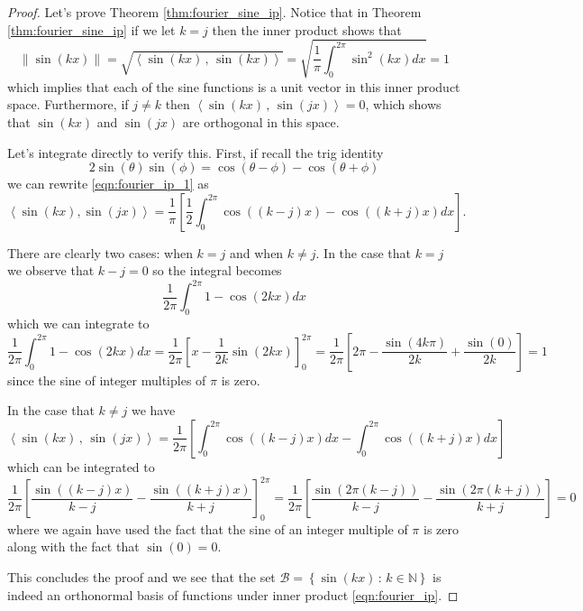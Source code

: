 \begin{proof}
    Let's prove Theorem \ref{thm:fourier_sine_ip}.  Notice that in Theorem
    \ref{thm:fourier_sine_ip} if we let $k=j$ then the inner product shows that 
    \[ \| \sin(kx) \| = \sqrt{ \left< \sin(kx) \, , \, \sin(kx) \right>} =
    \sqrt{\frac{1}{\pi} \int_0^{2\pi} \sin^2(kx) dx } = 1 \]
    which implies that each of the sine functions is a unit vector in this inner product
    space.  Furthermore, if $j \ne k$ then $\left< \sin(kx) \,,\, \sin(jx)\right> = 0$,
    which shows that $\sin(kx)$ and $\sin(jx)$ are orthogonal in this space.
    
    Let's integrate directly to verify this.  First, if recall the trig identity
    \[ 2\sin(\theta)\sin(\phi) = \cos(\theta - \phi) - \cos(\theta + \phi) \]
    we can rewrite \eqref{eqn:fourier_ip_1} as
    \[ \left< \sin(kx) , \sin(jx) \right> = \frac{1}{\pi} \left[ \frac{1}{2} \int_0^{2\pi}
    \cos\left( (k-j)x \right) - \cos\left( (k+j)x  \right) dx  \right]. \]

    There are clearly two cases: when $k=j$ and when $k\ne j$. 
    In the case that $k=j$ we observe that $k-j=0$ so the integral becomes 
    \[ \frac{1}{2\pi} \int_0^{2\pi} 1 - \cos(2kx) dx \]
    which we can integrate to 
    \[ \frac{1}{2\pi} \int_0^{2\pi} 1-\cos(2kx) dx = \frac{1}{2\pi} \left[ x -
        \frac{1}{2k}\sin(2kx)
    \right]_0^{2\pi} = \frac{1}{2\pi} \left[ 2\pi - \frac{\sin(4k\pi)}{2k} +
    \frac{\sin(0)}{2k} \right] = 1 \]
    since the sine of integer multiples of $\pi$ is zero.  

    In the case that $k \ne j$ we have
    \[ \left< \sin(kx) \, , \, \sin(jx) \right> = \frac{1}{2\pi} \left[ \int_0^{2\pi} \cos\left(
    (k-j)x \right) dx - \int_0^{2\pi} \cos\left( (k+j)x \right) dx \right] \]
    which can be integrated to
    \[ \frac{1}{2\pi} \left[ \frac{\sin\left( (k-j)x \right)}{k-j} - \frac{\sin\left(
    (k+j)x \right)}{k+j} \right]_0^{2\pi} = \frac{1}{2\pi} \left[ \frac{\sin\left(2\pi (k-j) \right)}{k-j} - \frac{\sin\left(
    2\pi(k+j) \right)}{k+j} \right] = 0 \] 
    where we again have used the fact that the sine of an integer multiple of $\pi$ is
    zero along with the fact that $\sin(0) = 0$.

    This concludes the proof and we see that the set $\mathcal{B} = \left\{ \sin(kx) \, : \, k
        \in \mathbb{N} \right\}$ is indeed an orthonormal basis of functions under
        inner product \eqref{eqn:fourier_ip}.
\end{proof}


